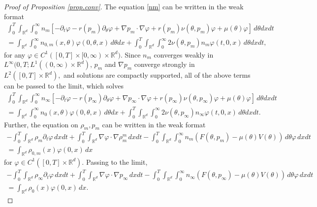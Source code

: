 \documentclass{amsart}
\def\R{\mathbb R}
\begin{document}
\begin{proof}[Proof of Proposition \ref{prop.conv}]
    The equation \eqref{nm} can be written in the weak format
    \begin{multline}\label{weak.ndep}
    \int_{0}^{T}\int_{\R^d} \int_{0}^{\infty}n_m [-\partial_t \varphi - r(p_m)\partial_\theta \varphi + \nabla p_m \cdot \nabla \varphi +r(p_m)\nu(\theta,p_m)\varphi+\mu(\theta)\varphi]\, d\theta dx dt\\ = \int_{\R^d} \int_{0}^{\infty}n_{0,m}(x,\theta) \varphi(0,\theta,x) \, d\theta dx +\int_{0}^{T}\int_{\R^d}\int_{0}^{\infty}2\nu(\theta,p_m)n_m\varphi(t,0,x)\, d\theta dx dt,
\end{multline}  for any $\varphi \in C^1([0,T]\times [0,\infty)\times \R^d).$
Since $n_m$ converges weakly in $L^\infty(0,T;L^1((0,\infty)\times \R^d)$, $p_m$ and $\nabla p_m$ converge strongly in $L^2([0,T]\times \R^d),$ and solutions are compactly supported, all of the above terms can be passed to the limit, which solves
\begin{multline}\label{weak.ndep.inf}
    \int_{0}^{T}\int_{\R^d} \int_{0}^{\infty}n_\infty [-\partial_t \varphi - r(p_\infty)\partial_\theta \varphi + \nabla p_\infty \cdot \nabla \varphi +r(p_\infty)\nu(\theta,p_\infty)\varphi+\mu(\theta)\varphi]\, d\theta dx dt \\= \int_{\R^d} \int_{0}^{\infty}n_{0}(x,\theta) \varphi(0,\theta,x) \, d\theta dx +\int_{0}^{T}\int_{\R^d}\int_{0}^{\infty}2\nu(\theta,p_\infty)n_\infty\varphi(t,0,x)\, d\theta dx dt.
\end{multline}
Further, the equation on $\rho_m,p_m$ can be written in the weak format
\begin{multline*}
-\int_{0}^{T}\int_{\R^d}\rho_m \partial_t \varphi \,dx dt+\int_{0}^{T}\int_{\R^d}\nabla \varphi \cdot \nabla \rho_m^m\,dxdt-\int_0^T \int_{\R^d}\int_{0}^{\infty}n_m(F(\theta,p_m)-\mu(\theta)V(\theta))\,d\theta \varphi \, dx dt \\=\int_{\R^d}\rho_{0,m}(x)\varphi(0,x)\,dx
\end{multline*}
for $\varphi \in C^1([0,T]\times \R^d).$ Passing to the limit, 
\begin{multline*}
    -\int_{0}^{T}\int_{\R^d}\rho_\infty \partial_t \varphi \,dx dt+\int_{0}^{T}\int_{\R^d}\nabla \varphi \cdot \nabla p_\infty \,dxdt-\int_0^T \int_{\R^d}\int_{0}^{\infty}n_\infty(F(\theta,p_\infty)-\mu(\theta)V(\theta))\,d\theta \varphi \, dx dt \\=\int_{\R^d}\rho_{0}(x)\varphi(0,x)\,dx.
\end{multline*}
\end{proof}
\end{document}
